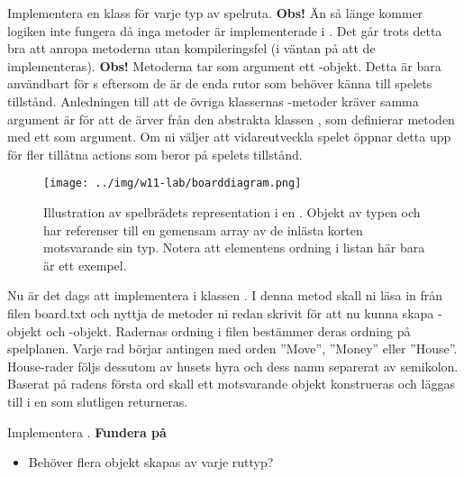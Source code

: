 \Subtask Implementera en klass för varje typ av spelruta.
\newline
\newline
\noindent
\textbf{Obs!} Än så länge kommer logiken inte fungera då inga metoder är implementerade i . Det går trots detta bra att anropa metoderna utan kompileringsfel (i väntan på att de implementeras).
\newline
\newline
\noindent
\textbf{Obs!} Metoderna  tar som argument ett -objekt. Detta är bara användbart för s eftersom de är de enda rutor som behöver känna till spelets tillstånd. Anledningen till att de övriga klassernas -metoder kräver samma argument är för att de ärver från den abstrakta klassen , som definierar metoden med ett  som argument. Om ni väljer att vidareutveckla spelet öppnar detta upp för fler tillåtna actions som beror på spelets tillstånd.


\begin{figure}[H]
\centering
\texttt{[image: ../img/w11-lab/boarddiagram.png]}
\caption {Illustration av spelbrädets representation i en . Objekt av typen  och  har referenser till en gemensam array av de inlästa korten motsvarande sin typ. Notera att elementens ordning i listan här bara är ett exempel.}
\label{fig:scalajava:lthopoly-team:boarddiagram}
\end{figure}

\Task Nu är det dags att implementera  i klassen . I denna metod skall ni läsa in från filen board.txt och nyttja de metoder ni redan skrivit för att nu kunna skapa -objekt och -objekt. Radernas ordning i filen bestämmer deras ordning på spelplanen. Varje rad börjar antingen med orden ''Move'', ''Money'' eller ''House''. House-rader följs dessutom av husets hyra och dess namn separerat av semikolon. Baserat på radens första ord skall ett motsvarande objekt konstrueras och läggas till i en  som slutligen returneras.

\Subtask Implementera .
\newline
\newline
\textbf{Fundera på}
\begin{itemize}
\item Behöver flera objekt skapas av varje ruttyp?
\end{itemize}


